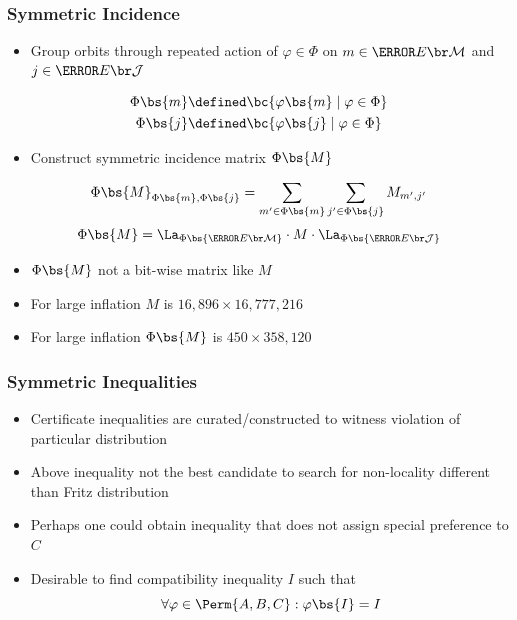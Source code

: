 \documentclass[
    hyperref={bookmarks=false},%
    xcolor={dvipsnames},
]{beamer}
\renewcommand{\term}[1]{\textcolor{Mahogany}{#1}}
\renewcommand{\tcdot}{\cdot} %
\begin{document}
\begin{frame}
    \frametitle{Symmetric Incidence}
    \begin{itemize}
        \item Group orbits through repeated action of $\varphi \in \Phi$ on $m \in \Events{\mscenario}$ and $j \in \Events{\jointvar}$
    \end{itemize}
    \begin{align*}
        \Phi\bs{m} &\defined \bc{\varphi\bs{m} \mid \varphi \in \Phi} \\
        \Phi\bs{j} &\defined \bc{\varphi\bs{j} \mid \varphi \in \Phi}
    \end{align*}
    \begin{itemize}
        \item Construct \term{symmetric incidence matrix} $\Phi\bs{M}$
    \end{itemize}
    \[ \Phi\bs{M}_{\Phi\bs{m}, \Phi\bs{j}} = \sum_{m' \in \Phi\bs{m}}\sum_{j' \in \Phi\bs{j}} M_{m',j'} \]
    \[ \Phi\bs{M} = \La_{\Phi\bs{\Events{\mscenario}}}\tcdot M \tcdot \La_{\Phi\bs{\Events{\jointvar}}} \]
    \begin{itemize}
        \item $\Phi\bs{M}$ not a bit-wise matrix like $M$
        \item For large inflation $M$ is $16,896 \times 16,777,216$
        \item For large inflation $\Phi\bs{M}$ is $450 \times 358,120$ %
    \end{itemize}
\end{frame}


\begin{frame}
    \frametitle{Symmetric Inequalities}
    \begin{itemize}
        \item Certificate inequalities are curated/constructed to witness violation of particular distribution
        \item Above inequality not the best candidate to search for non-locality different than Fritz distribution
        \item Perhaps one could obtain inequality that does not assign special preference to $C$
        \item Desirable to find compatibility inequality $I$ such that
        \[ \forall \varphi \in \Perm{A,B,C} : \varphi\bs{I} = I \]
    \end{itemize}
\end{frame}
\end{document}
